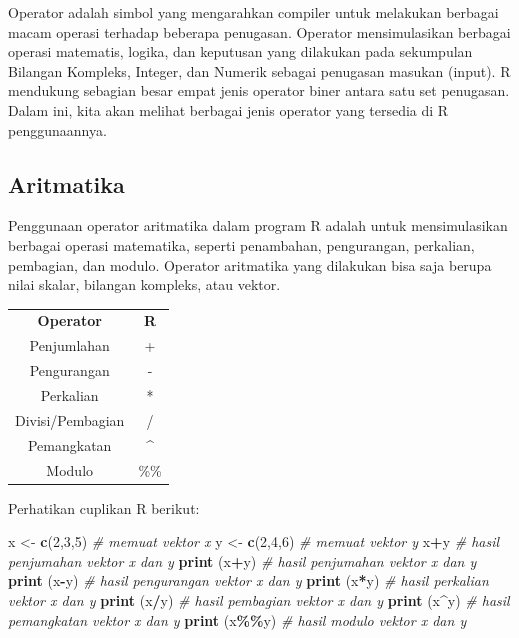 \documentclass[
]{book}
\newenvironment{Shaded}{\begin{snugshade}}{\end{snugshade}}
\newcommand{\CommentTok}[1]{\textcolor[rgb]{0.56,0.35,0.01}{\textit{#1}}}
\newcommand{\DecValTok}[1]{\textcolor[rgb]{0.00,0.00,0.81}{#1}}
\newcommand{\FunctionTok}[1]{\textcolor[rgb]{0.13,0.29,0.53}{\textbf{#1}}}
\newcommand{\NormalTok}[1]{#1}
\newcommand{\OtherTok}[1]{\textcolor[rgb]{0.56,0.35,0.01}{#1}}
\newcommand{\SpecialCharTok}[1]{\textcolor[rgb]{0.81,0.36,0.00}{\textbf{#1}}}
\begin{document}
Operator adalah simbol yang mengarahkan compiler untuk melakukan berbagai macam operasi terhadap beberapa penugasan. Operator mensimulasikan berbagai operasi matematis, logika, dan keputusan yang dilakukan pada sekumpulan Bilangan Kompleks, Integer, dan Numerik sebagai penugasan masukan (input). R mendukung sebagian besar empat jenis operator biner antara satu set penugasan. Dalam ini, kita akan melihat berbagai jenis operator yang tersedia di R penggunaannya.

\hypertarget{aritmatika}{%
\subsection{Aritmatika}\label{aritmatika}}

Penggunaan operator aritmatika dalam program R adalah untuk mensimulasikan berbagai operasi matematika, seperti penambahan, pengurangan, perkalian, pembagian, dan modulo. Operator aritmatika yang dilakukan bisa saja berupa nilai skalar, bilangan kompleks, atau vektor.

\begin{longtable}[]{@{}cc@{}}
\toprule\noalign{}
\endhead
\bottomrule\noalign{}
\endlastfoot
\textbf{Operator} & \textbf{R} \\
Penjumlahan & + \\
Pengurangan & - \\
Perkalian & * \\
Divisi/Pembagian & / \\
Pemangkatan & \^{} \\
Modulo & \%\% \\
\end{longtable}

Perhatikan cuplikan R berikut:

\begin{Shaded}
\begin{Highlighting}[]
\NormalTok{x }\OtherTok{\textless{}{-}} \FunctionTok{c}\NormalTok{(}\DecValTok{2}\NormalTok{,}\DecValTok{3}\NormalTok{,}\DecValTok{5}\NormalTok{)    }\CommentTok{\# memuat vektor x}
\NormalTok{y }\OtherTok{\textless{}{-}} \FunctionTok{c}\NormalTok{(}\DecValTok{2}\NormalTok{,}\DecValTok{4}\NormalTok{,}\DecValTok{6}\NormalTok{)    }\CommentTok{\# memuat vektor y}
\NormalTok{x}\SpecialCharTok{+}\NormalTok{y              }\CommentTok{\# hasil penjumahan vektor x dan y}
\FunctionTok{print}\NormalTok{ (x}\SpecialCharTok{+}\NormalTok{y)      }\CommentTok{\# hasil penjumahan vektor x dan y}
\FunctionTok{print}\NormalTok{ (x}\SpecialCharTok{{-}}\NormalTok{y)      }\CommentTok{\# hasil pengurangan vektor x dan y}
\FunctionTok{print}\NormalTok{ (x}\SpecialCharTok{*}\NormalTok{y)      }\CommentTok{\# hasil perkalian vektor x dan y}
\FunctionTok{print}\NormalTok{ (x}\SpecialCharTok{/}\NormalTok{y)      }\CommentTok{\# hasil pembagian vektor x dan y}
\FunctionTok{print}\NormalTok{ (x}\SpecialCharTok{\^{}}\NormalTok{y)      }\CommentTok{\# hasil pemangkatan vektor x dan y}
\FunctionTok{print}\NormalTok{ (x}\SpecialCharTok{\%\%}\NormalTok{y)     }\CommentTok{\# hasil modulo vektor x dan y}
\end{Highlighting}
\end{Shaded}
\end{document}
